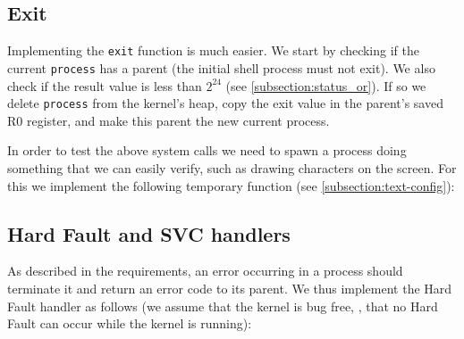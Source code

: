 
\subsection{Exit}

Implementing the {\tt exit} function is much easier. We start by checking if
the current {\tt process} has a parent (the initial shell process must not
exit). We also check if the result value is less than $2^{24}$ (see
\cref{subsection:status_or}). If so we delete {\tt process} from the kernel's
heap, copy the exit value in the parent's saved R0 register, and make this
parent the new current process.


In order to test the above system calls we need to spawn a process doing
something that we can easily verify, such as drawing characters on the screen.
For this we implement the following temporary function (see
\cref{subsection:text-config}):


\subsection{Hard Fault and SVC handlers}

As described in the requirements, an error occurring in a process should
terminate it and return an error code to its parent. We thus implement the Hard
Fault handler as follows (we assume that the kernel is bug free, \ie, that no
Hard Fault can occur while the kernel is running):

